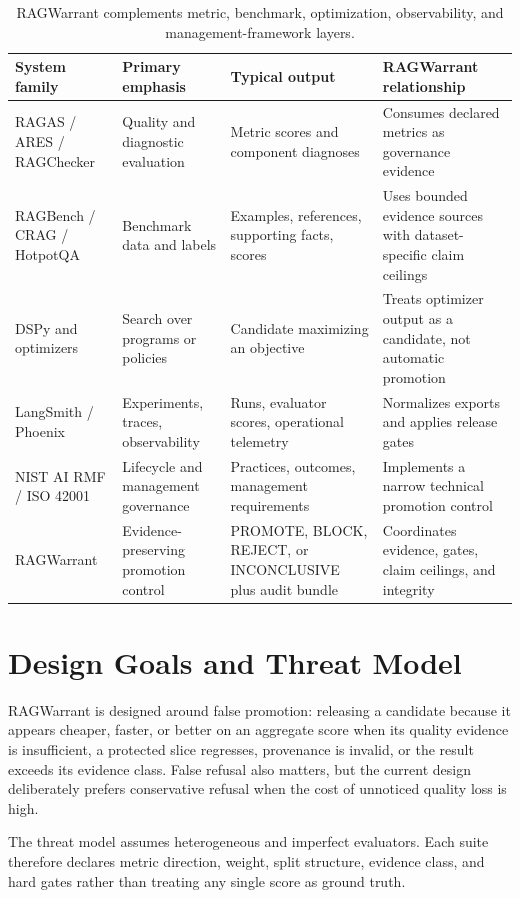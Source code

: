 \documentclass[11pt]{article}
\begin{document}
\begin{table}[t]
\centering
\caption{RAGWarrant complements metric, benchmark, optimization, observability, and management-framework layers.}
\small
\begin{tabularx}{\linewidth}{>{\raggedright\arraybackslash}X>{\raggedright\arraybackslash}X>{\raggedright\arraybackslash}X>{\raggedright\arraybackslash}X}
\toprule
\textbf{System family} & \textbf{Primary emphasis} & \textbf{Typical output} & \textbf{RAGWarrant relationship} \\
\midrule
RAGAS / ARES / RAGChecker & Quality and diagnostic evaluation & Metric scores and component diagnoses & Consumes declared metrics as governance evidence \\
RAGBench / CRAG / HotpotQA & Benchmark data and labels & Examples, references, supporting facts, scores & Uses bounded evidence sources with dataset-specific claim ceilings \\
DSPy and optimizers & Search over programs or policies & Candidate maximizing an objective & Treats optimizer output as a candidate, not automatic promotion \\
LangSmith / Phoenix & Experiments, traces, observability & Runs, evaluator scores, operational telemetry & Normalizes exports and applies release gates \\
NIST AI RMF / ISO 42001 & Lifecycle and management governance & Practices, outcomes, management requirements & Implements a narrow technical promotion control \\
RAGWarrant & Evidence-preserving promotion control & PROMOTE, BLOCK, REJECT, or INCONCLUSIVE plus audit bundle & Coordinates evidence, gates, claim ceilings, and integrity \\
\bottomrule
\end{tabularx}
\end{table}

\section{Design Goals and Threat Model}
RAGWarrant is designed around false promotion: releasing a candidate because it appears cheaper, faster, or better on an aggregate score when its quality evidence is insufficient, a protected slice regresses, provenance is invalid, or the result exceeds its evidence class. False refusal also matters, but the current design deliberately prefers conservative refusal when the cost of unnoticed quality loss is high.

The threat model assumes heterogeneous and imperfect evaluators. Each suite therefore declares metric direction, weight, split structure, evidence class, and hard gates rather than treating any single score as ground truth.
\end{document}
